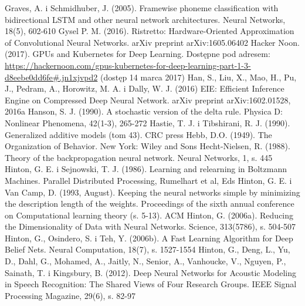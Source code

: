 \documentclass[12pt,a4paper,twoside]{article}
\begin{document}
\begin{thebibliography}{99}
 Graves, A. i Schmidhuber, J. (2005). Framewise phoneme classification with bidirectional LSTM and other neural network architectures. Neural Networks, 18(5), 602-610
 Gysel P. M. (2016). Ristretto: Hardware-Oriented Approximation of Convolutional Neural Networks. arXiv preprint arXiv:1605.06402
 Hacker Noon. (2017). GPUs and Kubernetes for Deep Learning. Dostępne pod adresem: \url{https://hackernoon.com/gpus-kubernetes-for-deep-learning-part-1-3-d8eebe0dd6fe#.jn1xjvpd2} (dostęp 14 marca 2017)
 Han, S., Liu, X., Mao, H., Pu, J., Pedram, A., Horowitz, M. A. i Dally, W. J. (2016) EIE: Efficient Inference Engine on Compressed Deep Neural Network. arXiv preprint arXiv:1602.01528, 2016a
 Hanson, S. J. (1990). A stochastic version of the delta rule. Physica D: Nonlinear Phenomena, 42(1-3), 265-272
 Hastie, T. J. i Tibshirani, R. J. (1990). Generalized additive models (tom 43). CRC press
 Hebb, D.O. (1949). The Organization of Behavior. New York: Wiley and Sons
 Hecht-Nielsen, R. (1988). Theory of the backpropagation neural network. Neural Networks, 1, s. 445
 Hinton, G. E. i Sejnowski, T. J. (1986). Learning and relearning in Boltzmann Machines. Parallel Distributed Processing, Rumelhart et al, Eds
 Hinton, G. E. i Van Camp, D. (1993, August). Keeping the neural networks simple by minimizing the description length of the weights. Proceedings of the sixth annual conference on Computational learning theory (s. 5-13). ACM
 Hinton, G. (2006a). Reducing the Dimensionality of Data with Neural Networks. Science, 313(5786), s. 504-507
 Hinton, G., Osindero, S. i Teh, Y. (2006b). A Fast Learning Algorithm for Deep Belief Nets. Neural Computation, 18(7), s. 1527-1554
 Hinton, G., Deng, L., Yu, D., Dahl, G., Mohamed, A., Jaitly, N., Senior, A., Vanhoucke, V., Nguyen, P., Sainath, T. i Kingsbury, B. (2012). Deep Neural Networks for Acoustic Modeling in Speech Recognition: The Shared Views of Four Research Groups. IEEE Signal Processing Magazine, 29(6), s. 82-97

\end{thebibliography}
\end{document}
